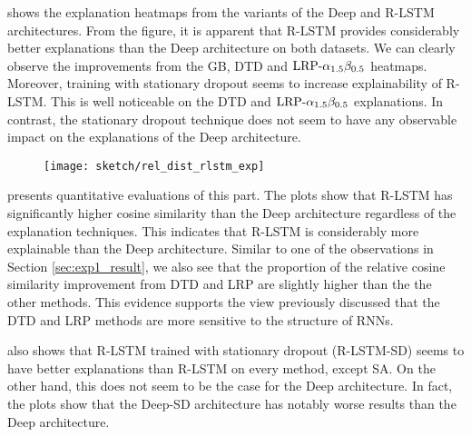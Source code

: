 \addfigure{\ref{fig:heatmap_msc_rlstm_exp}} shows the explanation heatmaps from the variants of the Deep and R-LSTM architectures. From the figure, it is apparent that R-LSTM provides considerably better explanations than the Deep architecture on both datasets. We can clearly observe the improvements from the GB, DTD and $\text{LRP-}\alpha_{1.5}\beta_{0.5}$ heatmaps. Moreover, training with stationary dropout seems to increase explainability of  R-LSTM. This is well noticeable on the DTD and $\text{LRP-}\alpha_{1.5}\beta_{0.5}$ explanations. In contrast, the stationary dropout technique does not seem to have any observable  impact on the explanations of the Deep architecture.


 \begin{figure}[!htb]
\centering
\texttt{[image: sketch/rel\_dist\_rlstm\_exp]}

\label{fig:rel_dist_rlstm_exp}
\end{figure}

\addfigure{\ref{fig:rel_dist_rlstm_exp}} presents quantitative evaluations of this part. The plots show that  R-LSTM has significantly higher cosine similarity than the Deep architecture regardless of the explanation techniques.  This indicates that R-LSTM is considerably  more explainable than the Deep architecture. Similar to one of the observations in Section \ref{sec:exp1_result}, we also see that the proportion of  the relative cosine similarity improvement from DTD and LRP are slightly higher than the the other methods. This evidence supports the view previously discussed that the DTD and LRP methods are more sensitive to the structure of RNNs.

\addfigure{\ref{fig:rel_dist_rlstm_exp}}  also shows that  R-LSTM trained with stationary dropout (R-LSTM-SD) seems to have better explanations than R-LSTM on every method, except SA. On the other hand, this does not seem to be the case for the Deep architecture. In fact, the plots show that the Deep-SD architecture has notably worse results than the Deep architecture.


